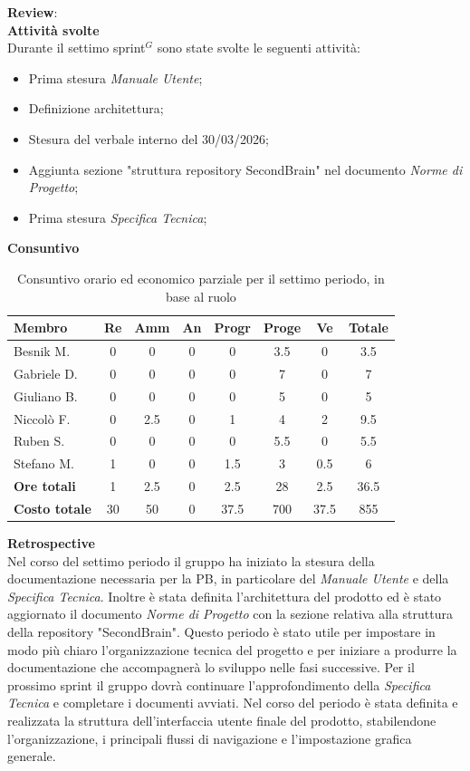 \documentclass[a4paper,10pt]{article}
\begin{document}
\textbf{Review}: \\
\textbf{Attività svolte}\\
Durante il settimo sprint$^G$ sono state svolte le seguenti attività:
\begin{itemize}
  \item Prima stesura \textit{Manuale Utente};
  \item Definizione architettura;
  \item Stesura del verbale interno del 30/03/2026;
  \item Aggiunta sezione "struttura repository SecondBrain" nel documento \textit{Norme di Progetto};
  \item Prima stesura \textit{Specifica Tecnica};
\end{itemize}
\textbf{Consuntivo}
\begin{table}[H]
\centering
\begin{tabular}{|l|c|c|c|c|c|c|c|}
\hline
\textbf{Membro} & \textbf{Re} & \textbf{Amm} & \textbf{An} & \textbf{Progr} & \textbf{Proge} & \textbf{Ve} & \textbf{Totale} \\
\hline
Besnik M.   & 0   & 0   & 0   & 0   & 3.5 & 0   & 3.5 \\
Gabriele D. & 0   & 0   & 0   & 0   & 7   & 0   & 7   \\
Giuliano B. & 0   & 0   & 0   & 0   & 5   & 0   & 5   \\
Niccolò F.  & 0   & 2.5 & 0   & 1   & 4   & 2   & 9.5 \\
Ruben S.    & 0   & 0   & 0   & 0   & 5.5 & 0   & 5.5 \\
Stefano M.  & 1   & 0   & 0   & 1.5 & 3   & 0.5 & 6   \\
\hline
\textbf{Ore totali} & 1  & 2.5 & 0   & 2.5  & 28  & 2.5 & 36.5 \\
\hline
\textbf{Costo totale} & 30  & 50 & 0 & 37.5  & 700  & 37.5 & 855 \\
\hline
\end{tabular}
\caption{Consuntivo orario ed economico parziale per il settimo periodo, in base al ruolo}
\end{table}

\textbf{Retrospective} \\
Nel corso del settimo periodo il gruppo ha iniziato la stesura della documentazione necessaria per la PB, in particolare del \textit{Manuale Utente} e della \textit{Specifica Tecnica}. Inoltre è stata definita l'architettura del prodotto ed è stato aggiornato il documento \textit{Norme di Progetto} con la sezione relativa alla struttura della repository "SecondBrain".
Questo periodo è stato utile per impostare in modo più chiaro l'organizzazione tecnica del progetto e per iniziare a produrre la documentazione che accompagnerà lo sviluppo nelle fasi successive. Per il prossimo sprint il gruppo dovrà continuare l'approfondimento della \textit{Specifica Tecnica} e completare i documenti avviati.
Nel corso del periodo è stata definita e realizzata la struttura dell’interfaccia utente finale del prodotto, stabilendone l’organizzazione, i principali flussi di navigazione e l’impostazione grafica generale.
\end{document}
